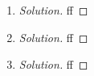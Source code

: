 \documentclass{article}
\begin{document}
\begin{enumerate}
	\item \begin{proof}[Solution]\let\qed\relax
		ff
	\end{proof}
	\item \begin{proof}[Solution]\let\qed\relax
		ff
	\end{proof}
	\item \begin{proof}[Solution]\let\qed\relax
		ff
	\end{proof}
\end{enumerate}
\clearpage
\end{document}

